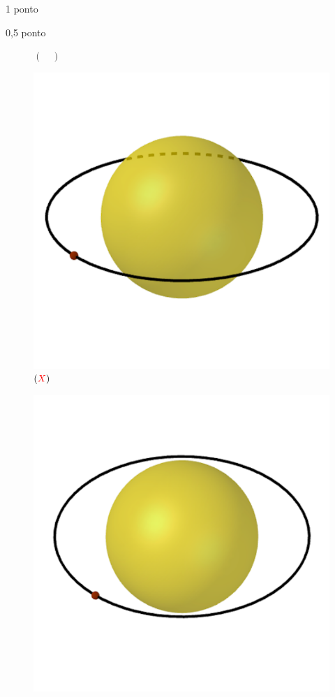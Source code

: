 \documentclass{../lista}
\begin{document}
\begin{questao}{1 ponto}
\begin{pergunta}{0,5 ponto}
\begin{multicols}{3}
\begin{figure}[H]
					\captionsetup{labelformat=empty}
					\caption{$(\quad)$}
				\end{figure}
				\begin{figure}[H]
					\centering
					\includegraphics[scale=0.2]{./img/5b3.png}
					\captionsetup{labelformat=empty}
					\caption{$(\textcolor{red}{X})$}
				\end{figure}
				\begin{figure}[H]
					\centering
					\includegraphics[scale=0.2]{./img/5b4.png}

\end{figure}
\end{multicols}
\end{pergunta}
\end{questao}
\end{document}
